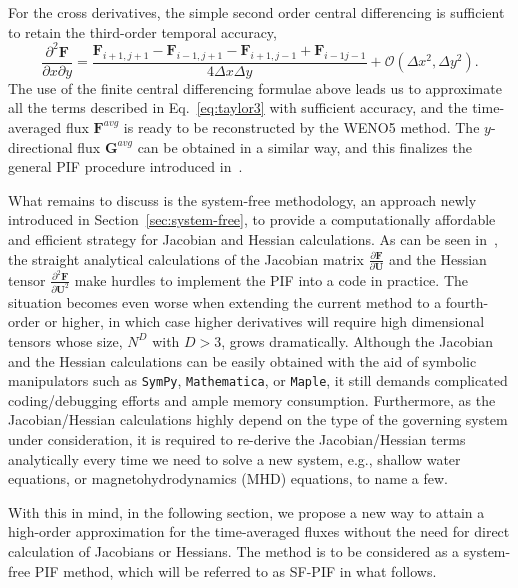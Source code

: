 \documentclass[times,preprint,3p]{elsarticle}
\newcommand{\pd}[2]{\frac{\partial #1}{\partial #2}}
\newcommand{\pdd}[2]{\frac{\partial^{2} #1}{\partial #2^{2}}}
\newcommand{\dx}{\Delta x}
\newcommand{\dy}{\Delta y}
\newcommand{\bF}{\mathbf{F}}
\newcommand{\bG}{\mathbf{G}}
\newcommand{\bU}{\mathbf{U}}
\begin{document}
For the cross derivatives, %
the simple second order central differencing is sufficient to retain the third-order temporal accuracy,
\begin{equation}\label{eq:dxy}
    \frac{\partial^{2} \bF}{\partial x \partial y} =
    \frac{\bF_{i+1, j+1} - \bF_{i-1, j+1} - \bF_{i+1, j-1} + \bF_{i-1 j-1}}{4\dx\dy} + \mathcal{O}(\dx^{2}, \dy^{2}).
\end{equation}
%
The use of the finite central differencing formulae above leads us to
approximate all the terms described in Eq.~\eqref{eq:taylor3} with sufficient accuracy,
and the time-averaged flux \( \bF^{avg} \) is ready to be reconstructed by the WENO5 method.
The \( y \)-directional flux \( \bG^{avg} \) can be obtained in a similar way, and
this finalizes the general PIF procedure introduced in~\cite{christlieb2015picard}.

What remains to discuss is the system-free methodology, an approach
newly introduced in Section~\ref{sec:system-free},
to provide a computationally affordable and efficient strategy for Jacobian and Hessian
calculations. As can be seen in~\cite{christlieb2015picard},
the straight analytical calculations of the Jacobian matrix
\( \pd{\bF}{\bU} \) and the Hessian tensor \( \pdd{\bF}{\bU} \)  make
hurdles to implement the PIF into a code in practice.
The situation becomes even worse when extending
the current method to a fourth-order or higher,
in which case higher derivatives will require high dimensional tensors
whose size, $N^D$ with $D>3$, grows dramatically.
%
Although the Jacobian and the Hessian calculations
can be easily obtained with the aid of symbolic
manipulators such as \texttt{SymPy}, \texttt{Mathematica}, or \texttt{Maple},
it still demands complicated coding/debugging efforts and ample memory consumption.
Furthermore, as the Jacobian/Hessian calculations highly depend
on the type of the governing system under consideration,
it is required to re-derive the Jacobian/Hessian terms analytically
every time we need to solve a new system,
e.g., shallow water equations, or magnetohydrodynamics (MHD) equations,
to name a few.

With this in mind, in the following section, we propose a new way to attain a high-order
approximation for the time-averaged fluxes without the need for direct
calculation of Jacobians or Hessians.
The method is to be considered as a system-free PIF method, which will be referred to as
SF-PIF in what follows.
\end{document}
